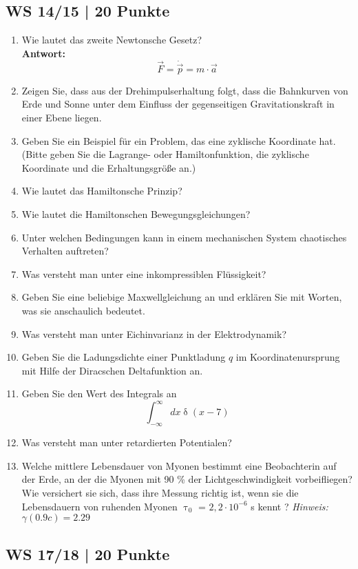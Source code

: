 \subsection{WS 14/15 | 20 Punkte} %
\begin{enumerate}
    \item Wie lautet das zweite Newtonsche Gesetz?\\
    \textbf{Antwort:}\\
    \begin{equation*}
        \vec{F} = \dot{\vec{p}} = m \cdot \vec{a}
    \end{equation*}
    \item Zeigen Sie, dass aus der Drehimpulserhaltung folgt, dass die Bahnkurven von Erde und Sonne unter dem Einfluss der gegenseitigen Gravitationskraft in einer Ebene liegen.
    \item Geben Sie ein Beispiel für ein Problem, das eine zyklische Koordinate hat. (Bitte geben Sie die Lagrange- oder Hamiltonfunktion, die zyklische Koordinate und die Erhaltungsgröße an.)
    \item Wie lautet das Hamiltonsche Prinzip?
    \item Wie lautet die Hamiltonschen Bewegungsgleichungen?
    \item Unter welchen Bedingungen kann in einem mechanischen System chaotisches Verhalten auftreten?
    \item Was versteht man unter eine inkompressiblen Flüssigkeit?
    \item Geben Sie eine beliebige Maxwellgleichung an und erklären Sie mit Worten, was sie anschaulich bedeutet.
    \item Was versteht man unter Eichinvarianz in der Elektrodynamik?
    \item Geben Sie die Ladungsdichte einer Punktladung $q$ im Koordinatenursprung mit Hilfe der Diracschen Deltafunktion an.
    \item Geben Sie den Wert des Integrals an
    \begin{equation*}
        \int_{-\infty}^{\infty} dx \updelta (x-7)
    \end{equation*}
    \item Was versteht man unter retardierten Potentialen?
    \item Welche mittlere Lebensdauer von Myonen bestimmt eine Beobachterin auf der Erde, an der die Myonen mit 90 \% der Lichtgeschwindigkeit vorbeifliegen? Wie versichert sie sich, dass ihre Messung richtig ist, wenn sie die Lebensdauern von ruhenden Myonen $\uptau_0$ = $2,2 \cdot 10^{-6}$ s kennt ? \textit{Hinweis: $\gamma(0.9c) = 2.29$}
\end{enumerate}
\subsection{WS 17/18 | 20 Punkte}



